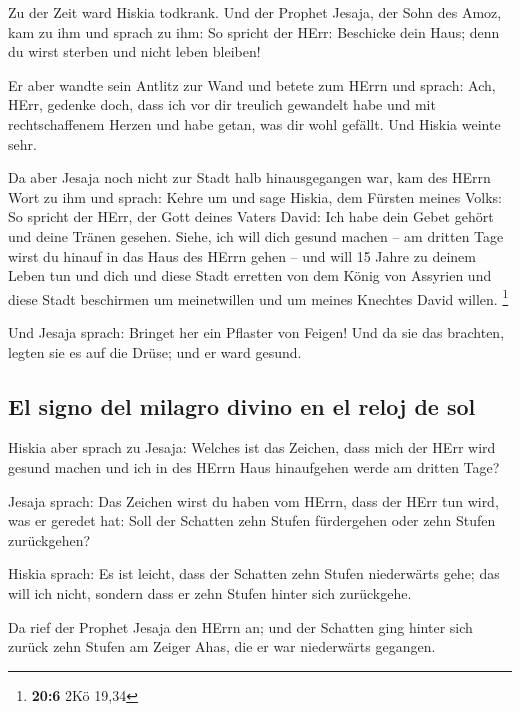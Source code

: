  Zu der Zeit ward Hiskia todkrank. Und der Prophet Jesaja,
der Sohn des Amoz, kam zu ihm und sprach zu ihm: So spricht der HErr:
Beschicke dein Haus; denn du wirst sterben und nicht leben bleiben!

 Er aber wandte sein Antlitz zur Wand und betete zum HErrn
und sprach:  Ach, HErr, gedenke doch, dass ich vor dir
treulich gewandelt habe und mit rechtschaffenem Herzen und habe getan,
was dir wohl gefällt. Und Hiskia weinte sehr.

 Da aber Jesaja noch nicht zur Stadt halb hinausgegangen
war, kam des HErrn Wort zu ihm und sprach:  Kehre um und
sage Hiskia, dem Fürsten meines Volks: So spricht der HErr, der Gott
deines Vaters David: Ich habe dein Gebet gehört und deine Tränen
gesehen. Siehe, ich will dich gesund machen -- am dritten Tage wirst du
hinauf in das Haus des HErrn gehen --  und will 15 Jahre
zu deinem Leben tun und dich und diese Stadt erretten von dem König von
Assyrien und diese Stadt beschirmen um meinetwillen und um meines
Knechtes David willen. \footnote{\textbf{20:6} 2Kö 19,34}

 Und Jesaja sprach: Bringet her ein Pflaster von Feigen!
Und da sie das brachten, legten sie es auf die Drüse; und er ward
gesund.

\hypertarget{el-signo-del-milagro-divino-en-el-reloj-de-sol}{%
\subsection{El signo del milagro divino en el reloj de
sol}\label{el-signo-del-milagro-divino-en-el-reloj-de-sol}}

 Hiskia aber sprach zu Jesaja: Welches ist das Zeichen,
dass mich der HErr wird gesund machen und ich in des HErrn Haus
hinaufgehen werde am dritten Tage?

 Jesaja sprach: Das Zeichen wirst du haben vom HErrn, dass
der HErr tun wird, was er geredet hat: Soll der Schatten zehn Stufen
fürdergehen oder zehn Stufen zurückgehen?

 Hiskia sprach: Es ist leicht, dass der Schatten zehn
Stufen niederwärts gehe; das will ich nicht, sondern dass er zehn Stufen
hinter sich zurückgehe.

 Da rief der Prophet Jesaja den HErrn an; und der
Schatten ging hinter sich zurück zehn Stufen am Zeiger Ahas, die er war
niederwärts gegangen.

